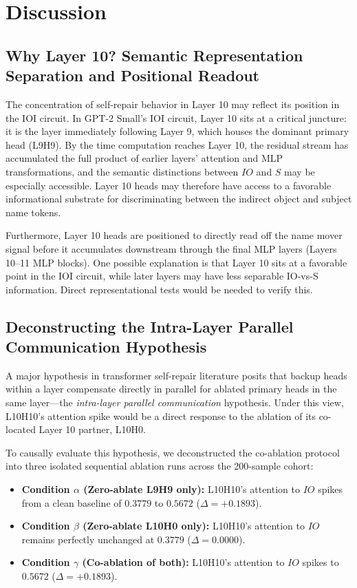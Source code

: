 \documentclass[12pt,a4paper]{article}
\begin{document}
\section{Discussion}
\label{sec:discussion}

\subsection{Why Layer 10? Semantic Representation Separation and Positional Readout}
\label{subsec:layer10}

The concentration of self-repair behavior in Layer 10 may reflect its position in the IOI circuit. In GPT-2 Small's IOI circuit, Layer 10 sits at a critical
juncture: it is the layer immediately following Layer 9, which houses the
dominant primary head (L9H9). By the time computation reaches Layer 10, the
residual stream has accumulated the full product of earlier layers' attention
and MLP transformations, and the semantic distinctions between $IO$ and $S$ may be especially accessible. Layer 10 heads may therefore have access to a favorable informational substrate for discriminating between the indirect object
and subject name tokens.

Furthermore, Layer 10 heads are positioned to directly read off the name mover
signal before it accumulates downstream through the final MLP layers
(Layers 10--11 MLP blocks). One possible explanation is that Layer 10 sits at a
favorable point in the IOI circuit, while later layers may have less separable
IO-vs-S information. Direct representational tests would be needed to verify this.

\subsection{Deconstructing the Intra-Layer Parallel Communication Hypothesis}
\label{subsec:isolation}

A major hypothesis in transformer self-repair literature posits that backup heads within a layer compensate directly in parallel for ablated primary heads in the same layer—the \emph{intra-layer parallel communication} hypothesis. Under this view, L10H10's attention spike would be a direct response to the ablation of its co-located Layer 10 partner, L10H0. 

To causally evaluate this hypothesis, we deconstructed the co-ablation protocol into three isolated sequential ablation runs across the 200-sample cohort:
\begin{itemize}
  \item \textbf{Condition $\alpha$ (Zero-ablate L9H9 only):} L10H10's attention to $IO$ spikes from a clean baseline of $0.3779$ to $0.5672$ ($\Delta = +0.1893$).
  \item \textbf{Condition $\beta$ (Zero-ablate L10H0 only):} L10H10's attention to $IO$ remains perfectly unchanged at $0.3779$ ($\Delta = 0.0000$).
  \item \textbf{Condition $\gamma$ (Co-ablation of both):} L10H10's attention to $IO$ spikes to $0.5672$ ($\Delta = +0.1893$).
\end{itemize}
\end{document}
